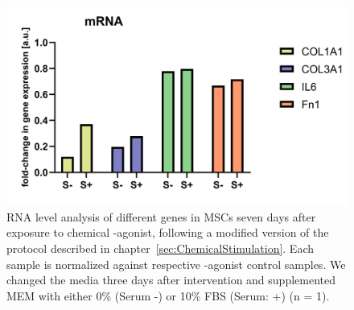 \begin{figure}
	\centering
	\includegraphics[width = \linewidth{}]{LongTerm_PCR.png}
	\caption{RNA level analysis of different genes in MSCs seven days after exposure to chemical \Piezo{}-agonist, following a modified version of the protocol described in chapter~\ref{sec:ChemicalStimulation}. Each sample is normalized against respective \Piezo{}-agonist control samples. We changed the media three days after intervention and supplemented MEM\textalpha{} with either 0\% (Serum -) or 10\% FBS (Serum: +) (n = 1).}
	\label{fig:LongTerm_PCR}
\end{figure}

